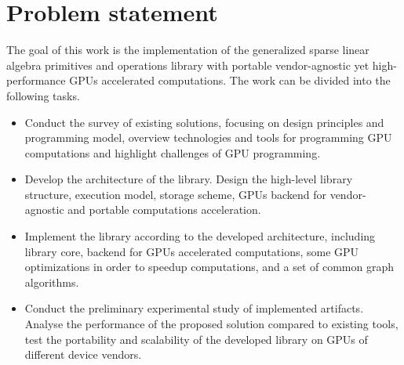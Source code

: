 \section{Problem statement}

The goal of this work is the implementation of the generalized sparse linear algebra primitives and operations library with portable vendor-agnostic yet high-performance GPUs accelerated computations. The work can be divided into the following tasks.

\begin{itemize}
    \item Conduct the survey of existing solutions, focusing on design principles and programming model, overview technologies and tools for programming GPU computations and highlight challenges of GPU programming.
    
    \item Develop the architecture of the library. Design the high-level library structure, execution model, storage scheme, GPUs backend for vendor-agnostic and portable computations acceleration.
    
    \item Implement the library according to the developed architecture, including library core, backend for GPUs accelerated computations, some GPU optimizations in order to speedup computations, and a set of common graph algorithms.

    
    \item Conduct the preliminary experimental study of implemented artifacts. Analyse the performance of the proposed solution compared to existing tools, test the portability and scalability of the developed library on GPUs of different device vendors.
\end{itemize}